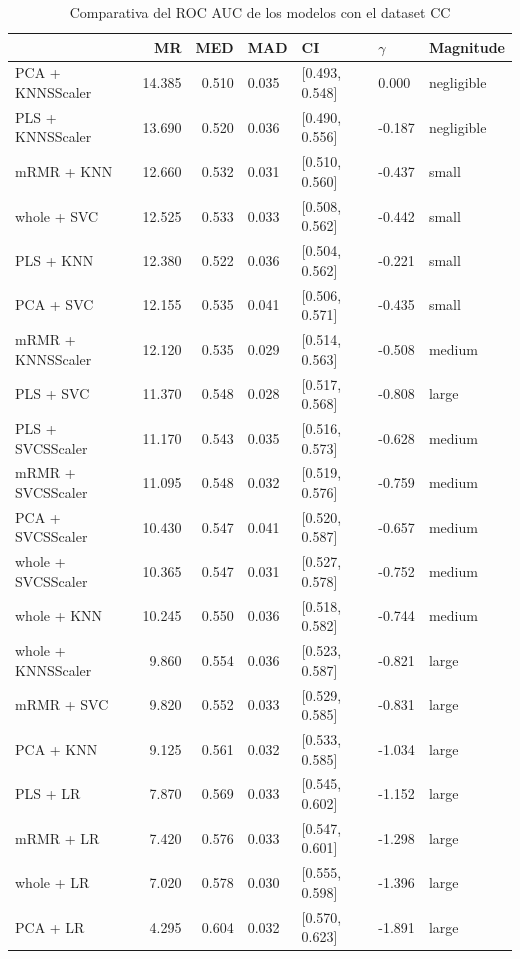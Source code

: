 \documentclass[a4paper,oneside,11pt,leqno]{article}
\begin{document}
	\begin{table}[h]
		\centering
		\begin{tabular}{lrrllll}
			\toprule
			{} &     MR &   MED &   MAD &              CI & $\gamma$ &   Magnitude \\
			\midrule
			PCA + KNNSScaler   & 14.385 & 0.510 & 0.035 &  [0.493, 0.548] &     0.000 &  negligible \\
			PLS + KNNSScaler   & 13.690 & 0.520 & 0.036 &  [0.490, 0.556] &    -0.187 &  negligible \\
			mRMR + KNN         & 12.660 & 0.532 & 0.031 &  [0.510, 0.560] &    -0.437 &       small \\
			whole + SVC        & 12.525 & 0.533 & 0.033 &  [0.508, 0.562] &    -0.442 &       small \\
			PLS + KNN          & 12.380 & 0.522 & 0.036 &  [0.504, 0.562] &    -0.221 &       small \\
			PCA + SVC          & 12.155 & 0.535 & 0.041 &  [0.506, 0.571] &    -0.435 &       small \\
			mRMR + KNNSScaler  & 12.120 & 0.535 & 0.029 &  [0.514, 0.563] &    -0.508 &      medium \\
			PLS + SVC          & 11.370 & 0.548 & 0.028 &  [0.517, 0.568] &    -0.808 &       large \\
			PLS + SVCSScaler   & 11.170 & 0.543 & 0.035 &  [0.516, 0.573] &    -0.628 &      medium \\
			mRMR + SVCSScaler  & 11.095 & 0.548 & 0.032 &  [0.519, 0.576] &    -0.759 &      medium \\
			PCA + SVCSScaler   & 10.430 & 0.547 & 0.041 &  [0.520, 0.587] &    -0.657 &      medium \\
			whole + SVCSScaler & 10.365 & 0.547 & 0.031 &  [0.527, 0.578] &    -0.752 &      medium \\
			whole + KNN        & 10.245 & 0.550 & 0.036 &  [0.518, 0.582] &    -0.744 &      medium \\
			whole + KNNSScaler &  9.860 & 0.554 & 0.036 &  [0.523, 0.587] &    -0.821 &       large \\
			mRMR + SVC         &  9.820 & 0.552 & 0.033 &  [0.529, 0.585] &    -0.831 &       large \\
			PCA + KNN          &  9.125 & 0.561 & 0.032 &  [0.533, 0.585] &    -1.034 &       large \\
			PLS + LR           &  7.870 & 0.569 & 0.033 &  [0.545, 0.602] &    -1.152 &       large \\
			mRMR + LR          &  7.420 & 0.576 & 0.033 &  [0.547, 0.601] &    -1.298 &       large \\
			whole + LR         &  7.020 & 0.578 & 0.030 &  [0.555, 0.598] &    -1.396 &       large \\
			PCA + LR           &  4.295 & 0.604 & 0.032 &  [0.570, 0.623] &    -1.891 &       large \\
			\bottomrule
		\end{tabular}
		\caption{Comparativa del ROC AUC de los modelos con el dataset CC}
		\label{tab:stat_results_cc}
	\end{table}
	
\end{document}
